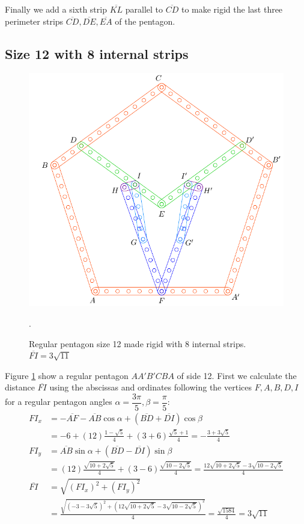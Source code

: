 \documentclass[11pt]{article}
\begin{document}
Finally we add a sixth strip $\overline{KL}$ parallel to $\overline{CD}$ to make rigid the last three perimeter strips $\overline{CD},\overline{DE},\overline{EA}$ of the pentagon.

\subsection{Size 12 with 8 internal strips}

\begin{figure}[h]
 \centering
 \includegraphics[scale=0.8]{12/penta12-8a}
 \caption{Regular pentagon size 12 made rigid with 8 internal strips. $\overline{FI} = 3\sqrt{11}$}.
 \label{fig:penta12-8a}
\end{figure}

Figure \ref{fig:penta12-8a} show a regular pentagon $AA'B'CBA$ of side 12.
First we calculate the distance $\overline{FI}$ using the abscissas and ordinates following the vertices $F,A,B,D,I$ for a regular pentagon angles $\alpha=\dfrac{3\pi}5, \beta=\dfrac{\pi}5$:
\begin{align}
FI_x &= -\overline{AF} - \overline{AB}\cos\alpha + (\overline{BD} + \overline{DI})\cos\beta\nonumber\\
 &= -6 + (12)\frac{1-\sqrt5}4 + (3+6)\frac{\sqrt5+1}4 = -\frac{3+3\sqrt5}4\\
FI_y &= \overline{AB}\sin\alpha + (\overline{BD}-\overline{DI})\sin\beta\nonumber\\
 &= (12)\frac{\sqrt{10+2\sqrt5}}4 + (3-6)\frac{\sqrt{10-2\sqrt5}}4
 = \frac{12\sqrt{10+2\sqrt5} - 3\sqrt{10-2\sqrt5}}4\\
\overline{FI} &= \sqrt{(FI_x)^2 + (FI_y)^2}\nonumber\\
 &= \frac{\sqrt{(-3-3\sqrt5)^2 + (12\sqrt{10+2\sqrt5} - 3\sqrt{10-2\sqrt5})^2}}4
 = \frac{\sqrt{1584}}4 = 3\sqrt{11}
\end{align}
\end{document}
